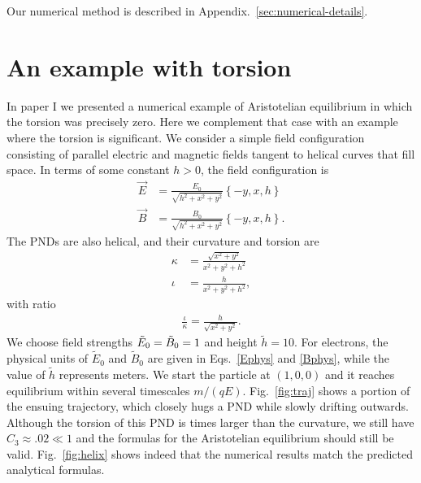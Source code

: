 \documentclass[amsmath,amssymb,nofootinbib,notitlepage,superscriptaddress,twocolumn]{revtex4-2}
\begin{document}
Our numerical method is described in Appendix.~\ref{sec:numerical-details}.

\section{An example with torsion}\label{sec:torsion}

In paper I we presented a numerical example of Aristotelian equilibrium in which the torsion was precisely zero.  Here we complement that case with an example where the torsion is significant.  We consider a simple field configuration consisting of parallel electric and magnetic fields tangent to helical curves that fill space.  In terms of some constant $h>0$, the field configuration is
\begin{align}
    \Vec{E} &= \frac{E_0}{\sqrt{h^2+x^2+y^2}}\left\{-y, x, h \right\} \label{Ehelix} \\
    \Vec{B} &= \frac{B_0}{\sqrt{h^2+x^2+y^2}}\left\{-y, x, h \right\}. \label{Bhelix}
\end{align}
The PNDs are also helical, and their curvature and torsion are
\begin{align}
\kappa & = \frac{\sqrt{x^2+y^2}}{x^2+y^2+h^2} \label{kappahelix} \\
\iota & = \frac{h}{x^2+y^2+h^2}, \label{iotahelix}
\end{align}
with ratio
\begin{align}
    \frac{\iota}{\kappa} = \frac{h}{\sqrt{x^2+y^2}}. 
\end{align}
We choose field strengths $\Tilde{E}_0=\tilde{B}_0=1$ and height $\tilde{h}=10$.  For electrons, the physical units of $\tilde{E}_0$ and $\tilde{B}_0$ are given in Eqs.~\eqref{Ephys} and \eqref{Bphys}, while the value of $\tilde{h}$ represents meters.  We start the particle at $(1,0,0)$ and it reaches equilibrium within several timescales $m/(q E)$. 
 Fig.~\ref{fig:traj} shows a portion of the ensuing trajectory, which closely hugs a PND while slowly drifting outwards.  Although the torsion of this PND is times larger than the curvature, we still have $C_3 \approx .02 \ll 1$ and the formulas for the Aristotelian equilibrium should still be valid. Fig.~\ref{fig:helix} shows indeed that the numerical results match the predicted analytical formulas.
\end{document}
